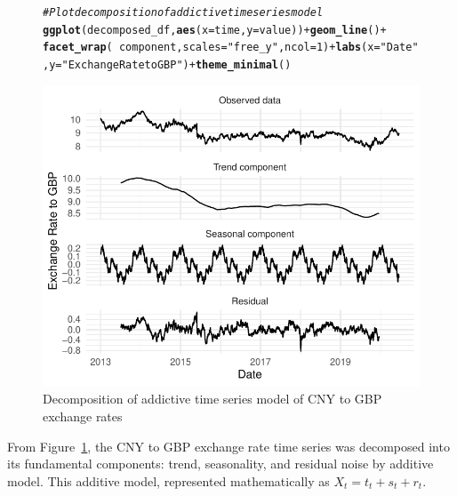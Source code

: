 \documentclass{article}\usepackage[]{graphicx}\usepackage[]{xcolor}
\makeatletter
\def\maxwidth{ %
  \ifdim\Gin@nat@width>\linewidth
    \linewidth
  \else
    \Gin@nat@width
  \fi
}
\newcommand{\hlnum}[1]{\textcolor[rgb]{0.686,0.059,0.569}{#1}}%
\newcommand{\hlstr}[1]{\textcolor[rgb]{0.192,0.494,0.8}{#1}}%
\newcommand{\hlcom}[1]{\textcolor[rgb]{0.678,0.584,0.686}{\textit{#1}}}%
\newcommand{\hlopt}[1]{\textcolor[rgb]{0,0,0}{#1}}%
\newcommand{\hlstd}[1]{\textcolor[rgb]{0.345,0.345,0.345}{#1}}%
\newcommand{\hlkwc}[1]{\textcolor[rgb]{0.333,0.667,0.333}{#1}}%
\newcommand{\hlkwd}[1]{\textcolor[rgb]{0.737,0.353,0.396}{\textbf{#1}}}%
\newenvironment{kframe}{%
 \def\at@end@of@kframe{}%
 \ifinner\ifhmode%
  \def\at@end@of@kframe{\end{minipage}}%
  \begin{minipage}{\columnwidth}%
 \fi\fi%
 \def\FrameCommand##1{\hskip\@totalleftmargin \hskip-\fboxsep
 \colorbox{shadecolor}{##1}\hskip-\fboxsep
     \hskip-\linewidth \hskip-\@totalleftmargin \hskip\columnwidth}%
 \MakeFramed {\advance\hsize-\width
   \@totalleftmargin\z@ \linewidth\hsize
   \@setminipage}}%
 {\par\unskip\endMakeFramed%
 \at@end@of@kframe}
\newenvironment{knitrout}{}{} %
\makeatother
\begin{document}
\begin{figure}[H]
\begin{knitrout}\scriptsize
{}\color{fgcolor}\begin{kframe}
\begin{alltt}
\hlcom{# Plot decomposition of addictive time series model}
\hlkwd{ggplot}\hlstd{(decomposed_df,} \hlkwd{aes}\hlstd{(}\hlkwc{x} \hlstd{= time,} \hlkwc{y} \hlstd{= value))} \hlopt{+} \hlkwd{geom_line}\hlstd{()} \hlopt{+}
  \hlkwd{facet_wrap}\hlstd{(}\hlopt{~}\hlstd{component,} \hlkwc{scales} \hlstd{=} \hlstr{"free_y"}\hlstd{,} \hlkwc{ncol} \hlstd{=} \hlnum{1}\hlstd{)} \hlopt{+} \hlkwd{labs}\hlstd{(}\hlkwc{x} \hlstd{=} \hlstr{"Date"}\hlstd{,}\hlkwc{y} \hlstd{=} \hlstr{"Exchange Rate to GBP"}\hlstd{)} \hlopt{+} \hlkwd{theme_minimal}\hlstd{()}
\end{alltt}
\end{kframe}

{\centering \includegraphics[width=\maxwidth]{figure/beamer-unnamed-chunk-4-1} 

}


\end{knitrout}
\centering
\caption{Decomposition of addictive time series model of CNY to GBP exchange rates}
\label{fig:decomposition of time series}
\end{figure}

\noindent
From Figure~\ref{fig:decomposition of time series}, the CNY to GBP exchange rate time series was decomposed into its fundamental components: trend, seasonality, and residual noise by additive model. This additive model, represented mathematically as $X_t = t_t + s_t + r_t$.\\
\end{document}
